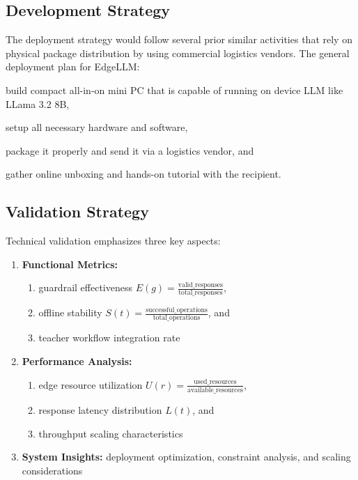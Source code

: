 \documentclass[sigconf]{acmart}
\begin{document}
\subsection{Development Strategy}
The deployment strategy would follow several prior similar activities that rely on physical package distribution by using commercial logistics vendors. The general deployment plan for EdgeLLM:
\begin{enumerate*}
    \item build compact all-in-on mini PC that is capable of running on device LLM like LLama 3.2 8B,
    \item setup all necessary hardware and software,
    \item package it properly and send it via a logistics vendor, and
    \item gather online unboxing and hands-on tutorial with the recipient.
\end{enumerate*}


\subsection{Validation Strategy}

Technical validation emphasizes three key aspects:
\begin{enumerate}
    \item \textbf{Functional Metrics:}
        \begin{enumerate}
            \item guardrail effectiveness $E(g) = \frac{\text{valid\_responses}}{\text{total\_responses}}$,
            \item offline stability $S(t) = \frac{\text{successful\_operations}}{\text{total\_operations}}$, and
            \item teacher workflow integration rate
        \end{enumerate}
    \item \textbf{Performance Analysis:}
        \begin{enumerate}
            \item edge resource utilization $U(r) = \frac{\text{used\_resources}}{\text{available\_resources}}$,
            \item response latency distribution $L(t)$, and
            \item throughput scaling characteristics
        \end{enumerate}
    \item \textbf{System Insights:}
        deployment optimization, constraint analysis, and scaling considerations
\end{enumerate}
\end{document}
